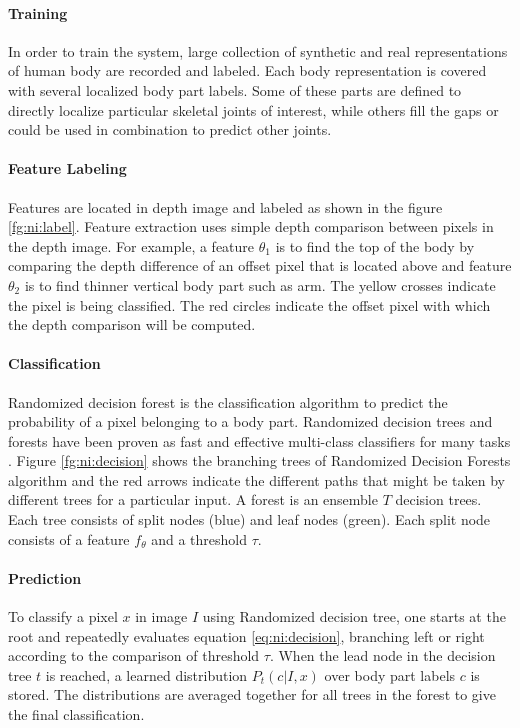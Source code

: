

\paragraph*{Training} In order to train the system, large collection of synthetic and real representations of human body are recorded and labeled. Each body representation is covered with several localized body part labels. Some of these parts are defined to directly localize particular skeletal joints of interest, while others fill the gaps or could be used in combination to predict other joints.

%

\paragraph*{Feature Labeling} Features are located in depth image and labeled as shown in the figure \ref{fg:ni:label}. Feature extraction uses simple depth comparison between pixels in the depth image. For example, a feature $\theta_{1}$ is to find the top of the body by comparing the depth difference of an offset pixel that is located above and feature $\theta_{2}$ is to find thinner vertical body part such as arm. The yellow crosses indicate the pixel is being classified. The red circles indicate the offset pixel with which the depth comparison will be computed.



\paragraph*{Classification} Randomized decision forest is the classification algorithm to predict the probability of a pixel belonging to a body part. Randomized decision trees and forests have been proven as fast and effective multi-class classifiers for many tasks \cite{13}. Figure \ref{fg:ni:decision} shows the branching trees of Randomized Decision Forests algorithm and the red arrows indicate the different paths that might be taken by different trees for a particular input. A forest is an ensemble $T$ decision trees. Each tree consists of split nodes (blue) and leaf nodes (green). Each split node consists of a feature $f_\theta$ and a threshold $\tau$. 



\paragraph*{Prediction} To classify a pixel $x$ in image $I$ using Randomized decision tree, one starts at the root and repeatedly evaluates equation \ref{eq:ni:decision}, branching left or right according to the comparison of threshold {$ \tau$}. When the lead node in the decision tree $t$ is reached, a learned distribution $ P_t(c|I,x) $ over body part labels $c$ is stored. The distributions are averaged together for all trees in the forest to give the final classification.


